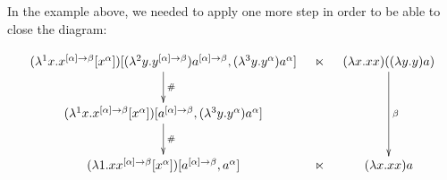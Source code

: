 \begin{example}
In the example above,
we needed to apply one more step in order to be able to close the diagram:

{\small
\[
    \xymatrix@C=.3cm{
      (\lamp{1}{\var}{\var^{[\alpha] \to \beta} [\var^{\alpha}]})
          [(\lamp{2}{\vartwo}{\vartwo^{[\alpha] \to \beta}}) a^{[\alpha] \to \beta},
           (\lamp{3}{\vartwo}{\vartwo^\alpha}) a^\alpha]
      \ar@{->}[d]^-{\dist}
      & \refines
      &
      (\lam{\var}{\var \var}) ((\lam{\vartwo}{\vartwo}) a)
      \ar@{->}[dd]^-{\beta}
      \\
      (\lamp{1}{\var}{\var^{[\alpha] \to \beta} [\var^{\alpha}]})
          [a^{[\alpha] \to \beta},
           (\lamp{3}{\vartwo}{\vartwo^\alpha}) a^\alpha]
      \ar@{->}[d]^-{\dist}
      &
      &
    \\
      (\lam{1}{\var}{\var^{[\alpha] \to \beta} [\var^{\alpha}]})
          [a^{[\alpha] \to \beta}, a^\alpha]
      &
      \refines
      &
      (\lam{\var}{\var \var}) a
    }
\]
}
\end{example}

